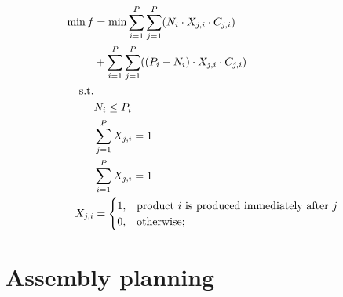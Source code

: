 \documentclass{article}
\begin{document}
	\begin{align}
		\min f &= \min \sum_{i=1}^{P}\sum_{j=1}^{P}(N_i\cdot X_{j,i}\cdot C_{j,i})\\&+\sum_{i=1}^{P}\sum_{j=1}^{P}((P_i-N_i)\cdot X_{j,i}\cdot C_{j,i})\\
		\text{s.t.} \nonumber\\
		&N_i \leq P_i\\
		&\sum_{j=1}^{P}X_{j,i}=1\\
		&\sum_{i=1}^{P}X_{j,i}=1\\
		X_{j,i}&=\begin{cases}
			1, & \text{product $ i $ is produced immediately after $ j $}\\
			0, &\text{otherwise};
		\end{cases}
	\end{align}

	\section{Assembly planning}
\end{document}
